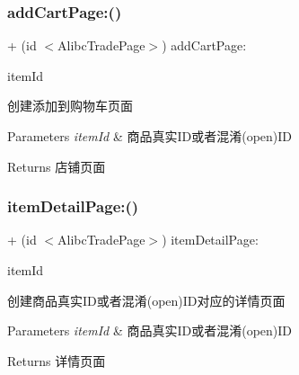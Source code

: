 \subsubsection{\texorpdfstring{add\+Cart\+Page\+:()}{addCartPage:()}}
{\footnotesize\ttfamily + (id $<$Alibc\+Trade\+Page$>$) add\+Cart\+Page\+: \begin{DoxyParamCaption}\item[{(N\+S\+String $\ast$)}]{item\+Id }\end{DoxyParamCaption}}

创建添加到购物车页面


\begin{DoxyParams}{Parameters}
{\em item\+Id} & 商品真实\+I\+D或者混淆(open)ID\\
\hline
\end{DoxyParams}
\begin{DoxyReturn}{Returns}
店铺页面 
\end{DoxyReturn}
\mbox{\label{interface_alibc_trade_page_factory_a0e8052358a1f6579f60a4fe60bd00508}} 
\subsubsection{\texorpdfstring{item\+Detail\+Page\+:()}{itemDetailPage:()}}
{\footnotesize\ttfamily + (id $<$Alibc\+Trade\+Page$>$) item\+Detail\+Page\+: \begin{DoxyParamCaption}\item[{(N\+S\+String $\ast$)}]{item\+Id }\end{DoxyParamCaption}}

创建商品真实\+I\+D或者混淆(open)I\+D对应的详情页面


\begin{DoxyParams}{Parameters}
{\em item\+Id} & 商品真实\+I\+D或者混淆(open)ID\\
\hline
\end{DoxyParams}
\begin{DoxyReturn}{Returns}
详情页面 
\end{DoxyReturn}
\mbox{\label{interface_alibc_trade_page_factory_a371f2a1d4e51fefcc05c11b2133a825c}} 
